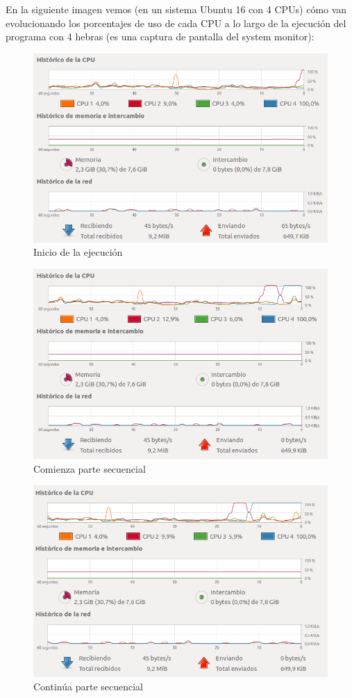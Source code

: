 \documentclass[12pt]{article}
\begin{document}
En la siguiente imagen vemos (en un sistema Ubuntu 16 con 4 CPUs) cómo van evolucionando los porcentajes de uso de cada CPU a lo largo de la ejecución del programa con 4 hebras (es una captura de pantalla del system monitor):
\begin{figure}[h]
	\centering
	\includegraphics[scale=0.5]{../images/2.png}
	\caption{Inicio de la ejecución}
\end{figure}
\begin{figure}[h]
	\centering
	\includegraphics[scale=0.5]{../images/3.png}
	\caption{Comienza parte secuencial}
\end{figure}
\begin{figure}[h]
	\centering
	\includegraphics[scale=0.5]{../images/4.png}
	\caption{Continúa parte secuencial}
\end{figure}
\end{document}
